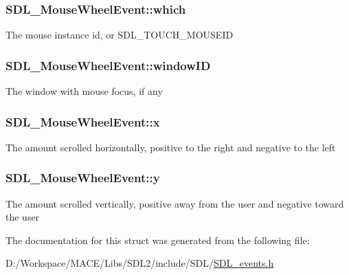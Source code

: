 \subsubsection[{\texorpdfstring{which}{which}}]{ S\+D\+L\+\_\+\+Mouse\+Wheel\+Event\+::which}\hypertarget{struct_s_d_l___mouse_wheel_event_a014dc767d52e8b75ba26a5f12e1704e8}{}\label{struct_s_d_l___mouse_wheel_event_a014dc767d52e8b75ba26a5f12e1704e8}
The mouse instance id, or S\+D\+L\+\_\+\+T\+O\+U\+C\+H\+\_\+\+M\+O\+U\+S\+E\+ID 
\subsubsection[{\texorpdfstring{window\+ID}{windowID}}]{ S\+D\+L\+\_\+\+Mouse\+Wheel\+Event\+::window\+ID}\hypertarget{struct_s_d_l___mouse_wheel_event_ab45eb1895217214ecb773fc555e08f6c}{}\label{struct_s_d_l___mouse_wheel_event_ab45eb1895217214ecb773fc555e08f6c}
The window with mouse focus, if any 
\subsubsection[{\texorpdfstring{x}{x}}]{ S\+D\+L\+\_\+\+Mouse\+Wheel\+Event\+::x}\hypertarget{struct_s_d_l___mouse_wheel_event_a6d904eef474ea45a5b1828fcb5b0f859}{}\label{struct_s_d_l___mouse_wheel_event_a6d904eef474ea45a5b1828fcb5b0f859}
The amount scrolled horizontally, positive to the right and negative to the left 
\subsubsection[{\texorpdfstring{y}{y}}]{ S\+D\+L\+\_\+\+Mouse\+Wheel\+Event\+::y}\hypertarget{struct_s_d_l___mouse_wheel_event_a53fdf77a464426bc8b30e629795f044b}{}\label{struct_s_d_l___mouse_wheel_event_a53fdf77a464426bc8b30e629795f044b}
The amount scrolled vertically, positive away from the user and negative toward the user 

The documentation for this struct was generated from the following file\+:\begin{DoxyCompactItemize}
\item 
D\+:/\+Workspace/\+M\+A\+C\+E/\+Libs/\+S\+D\+L2/include/\+S\+D\+L/\hyperlink{_s_d_l__events_8h}{S\+D\+L\+\_\+events.\+h}\end{DoxyCompactItemize}
